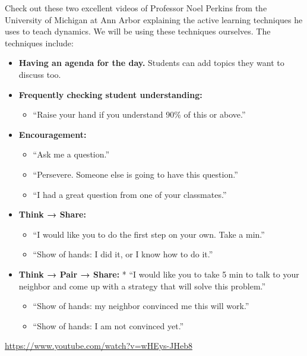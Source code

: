 \documentclass[
  letterpaper,
  DIV=11,
  numbers=noendperiod]{scrreprt}
\providecommand{\tightlist}{%
  \setlength{\itemsep}{0pt}\setlength{\parskip}{0pt}}
\begin{document}
Check out these two excellent videos of Professor Noel Perkins from the
University of Michigan at Ann Arbor explaining the active learning
techniques he uses to teach dynamics. We will be using these techniques
ourselves. The techniques include:

\begin{itemize}
\tightlist
\item
  \textbf{Having an agenda for the day.} Students can add topics they
  want to discuss too.
\item
  \textbf{Frequently checking student understanding:}

  \begin{itemize}
  \tightlist
  \item
    ``Raise your hand if you understand 90\% of this or above.''
  \end{itemize}
\item
  \textbf{Encouragement:}

  \begin{itemize}
  \tightlist
  \item
    ``Ask me a question.''
  \item
    ``Persevere. Someone else is going to have this question.''
  \item
    ``I had a great question from one of your classmates.''
  \end{itemize}
\item
  \textbf{Think → Share:}

  \begin{itemize}
  \tightlist
  \item
    ``I would like you to do the first step on your own. Take a min.''
  \item
    ``Show of hands: I did it, or I know how to do it.''
  \end{itemize}
\item
  \textbf{Think → Pair → Share:} * ``I would like you to take 5 min to
  talk to your neighbor and come up with a strategy that will solve this
  problem.''

  \begin{itemize}
  \tightlist
  \item
    ``Show of hands: my neighbor convinced me this will work.''
  \item
    ``Show of hands: I am not convinced yet.''
  \end{itemize}
\end{itemize}

\url{https://www.youtube.com/watch?v=wHEys-JHeb8}
\end{document}
